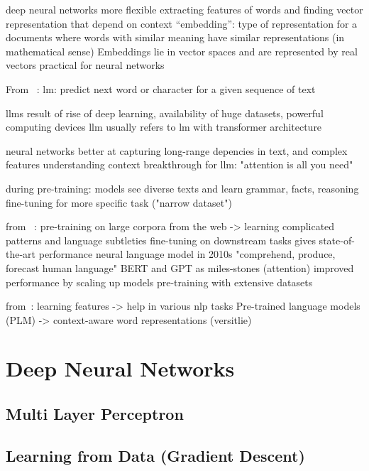 deep neural networks more flexible
extracting features of words and finding vector representation that depend on context
\enquote{embedding}: type of representation for a documents where words with similar meaning have similar representations (in mathematical sense)
Embeddings lie in vector spaces and are represented by real vectors
practical for neural networks

From ~\autocite{Hadi_2023}:
\gls{lm}: predict next word or character for a given sequence of text

\gls{llm}s result of rise of deep learning, availability of huge datasets, powerful computing devices
\gls{llm} usually refers to lm with transformer architecture

neural networks better at capturing long-range depencies in text, and complex features
understanding context
breakthrough for llm: "attention is all you need"

during pre-training: models see diverse texts and learn grammar, facts, reasoning
fine-tuning for more specific task ("narrow dataset")

from ~\autocite{Raiaan2024ARO}:
pre-training on large corpora from the web -> learning complicated patterns and language subtleties
fine-tuning on downstream tasks gives state-of-the-art performance
neural language model in 2010s
"comprehend, produce, forecast human language"
BERT and GPT as miles-stones (attention)
improved performance by scaling up models
pre-training with extensive datasets

from~\autocite{zhao2023survey}:
learning features -> help in various nlp tasks
Pre-trained language models (PLM) -> context-aware word representations (versitlie)


\section{Deep Neural Networks}\label{sec:dnn}

\subsection{Multi Layer Perceptron}\label{subsec:multi-layer-perceptron}

\subsection{Learning from Data (Gradient Descent)}\label{subsec:learning-from-data}

